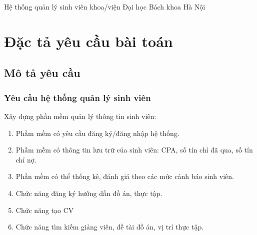 



Hệ thống quản lý sinh viên khoa/viện Đại học Bách khoa Hà Nội


\chapter{Đặc tả yêu cầu bài toán}
\section{Mô tả yêu cầu}
\subsection{Yêu cầu hệ thống quản lý sinh viên}
Xây dựng phần mềm quản lý thông tin sinh viên:
\begin{enumerate}
	\item Phầm mềm có yêu cầu đăng ký/đăng nhập hệ thống.
	\item Phầm mềm có thông tin lưu trữ của sinh viên: CPA, số tín chỉ đã qua, số tín chỉ nợ.
	\item Phần mềm có thể thống kê, đánh giá theo các mức cảnh báo sinh viên.
	\item Chức năng đăng ký hướng dẫn đồ án, thực tập.
	\item Chức năng tạo CV
	\item Chức năng tìm kiếm giảng viên, đề tài đồ án, vị trí thực tập.
\end{enumerate}

